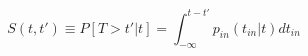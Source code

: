 \begin{equation}
S(t,t') \equiv P[T> t'|t] = \int_{-\infty}^{t-t'} p_{in}(t_{in}|t) dt_{in}
\end{equation}